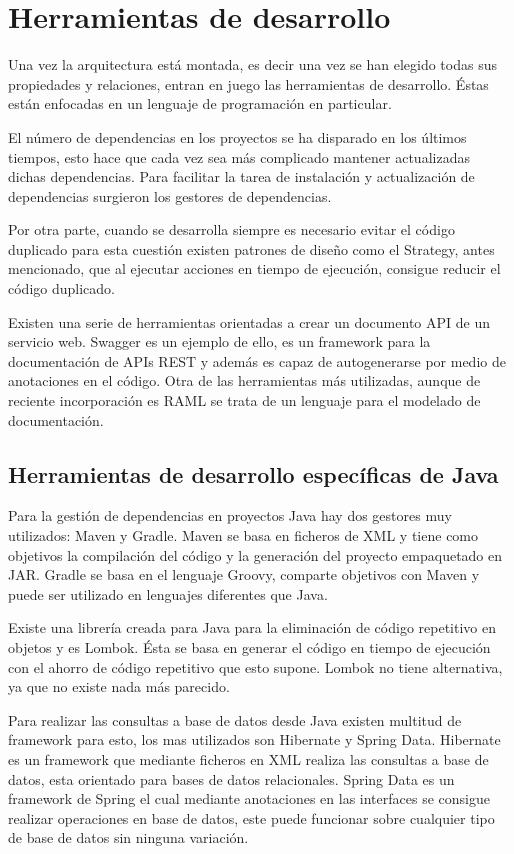 \documentclass[12pt]{report} %
\begin{document}
\section{Herramientas de desarrollo}

Una vez la arquitectura está montada, es decir una vez se han elegido todas sus propiedades y relaciones, entran en juego las herramientas de desarrollo. Éstas están enfocadas en un lenguaje de programación en particular.

El número de dependencias en los proyectos se ha disparado en los últimos tiempos, esto hace que cada vez sea más complicado mantener actualizadas dichas dependencias. Para facilitar la tarea de instalación y actualización de dependencias surgieron los gestores de dependencias.

Por otra parte, cuando se desarrolla siempre es necesario evitar el código duplicado para esta cuestión existen patrones de diseño como el Strategy, antes mencionado, que al ejecutar acciones en tiempo de ejecución, consigue reducir el código duplicado.

Existen una serie de herramientas orientadas a crear un documento API de un servicio web. Swagger es un ejemplo de ello, es un framework para la documentación de APIs REST y además es capaz de autogenerarse por medio de anotaciones en el código. Otra de las herramientas más utilizadas, aunque de reciente incorporación es RAML se trata de un lenguaje para el modelado de documentación.

\subsection{Herramientas de desarrollo específicas de Java}

Para la gestión de dependencias en proyectos Java hay dos gestores muy utilizados: Maven y Gradle. Maven se basa en ficheros de XML y tiene como objetivos la compilación del código y la generación del proyecto empaquetado en JAR. Gradle se basa en el lenguaje Groovy, comparte objetivos con Maven y puede ser utilizado en lenguajes diferentes que Java. 

Existe una librería creada para Java para la eliminación de código repetitivo en objetos y es Lombok.
Ésta se basa en generar el código en tiempo de ejecución con el ahorro de código repetitivo que esto supone. Lombok no tiene alternativa, ya que no existe nada más parecido.

Para realizar las consultas a base de datos desde Java existen multitud de framework para esto, los mas utilizados son Hibernate y Spring Data. Hibernate es un framework que mediante ficheros en XML realiza las consultas a base de datos, esta orientado para bases de datos relacionales. Spring Data es un framework de Spring el cual mediante anotaciones en las interfaces se consigue realizar operaciones en base de datos, este puede funcionar sobre cualquier tipo de base de datos sin ninguna variación. 
\end{document}
